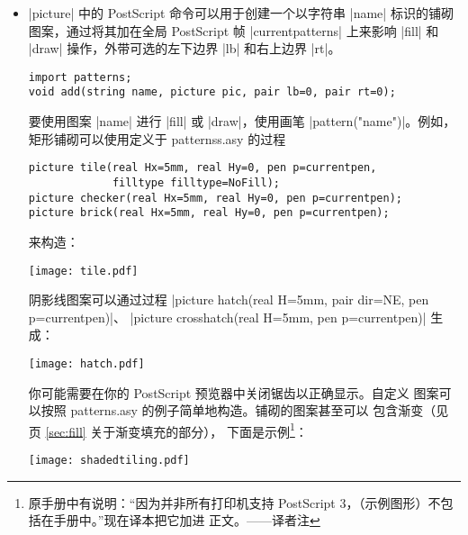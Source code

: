 \documentclass{ctexbook}
\newcommand*\prgname[1]{\textsf{#1}}
\newcommand\transnote[1]{\footnote{#1——译者注}}
\begin{document}
\begin{itemize}
  由于 \prgname{PostScript} 不支持透明，这个特性仅对 \verb=-f pdf= 输出格式
  选项有效。可以从 PDF 结果文件通过 \prgname{ImageMagick convert} 程序生成。
  标签永远以 |opacity| 值 |1| 绘制。透明填充的一个简单例子在示例文件
  \prgname{transparency.asy} 中给出\transnote{效果如下：\\
  \vbox{}%
  \texttt{[image: transparency.pdf]}\box0}。

\item |picture| 中的 \prgname{PostScript} 命令可以用于创建一个以字符串 |name|
  标识的铺砌图案，通过将其加在全局 \prgname{PostScript} 帧 |currentpatterns|
  上来影响 |fill| 和 |draw| 操作，外带可选的左下边界 |lb| 和右上边界 |rt|。
\begin{lstlisting}
import patterns;
void add(string name, picture pic, pair lb=0, pair rt=0);
\end{lstlisting}

  要使用图案 |name| 进行 |fill| 或 |draw|，使用画笔 |pattern("name")|。例如，
  矩形铺砌可以使用定义于 \prgname{patternss.asy} 的过程
\begin{lstlisting}
picture tile(real Hx=5mm, real Hy=0, pen p=currentpen,
             filltype filltype=NoFill);
picture checker(real Hx=5mm, real Hy=0, pen p=currentpen);
picture brick(real Hx=5mm, real Hy=0, pen p=currentpen);
\end{lstlisting}
  来构造：

\begin{center}
  \texttt{[image: tile.pdf]}
\end{center}
  阴影线图案可以通过过程
  |picture hatch(real H=5mm, pair dir=NE, pen p=currentpen)|、
  |picture crosshatch(real H=5mm, pen p=currentpen)| 生成：

\begin{center}
  \texttt{[image: hatch.pdf]}
\end{center}

  你可能需要在你的 \prgname{PostScript} 预览器中关闭锯齿以正确显示。自定义
  图案可以按照 \prgname{patterns.asy} 的例子简单地构造。铺砌的图案甚至可以
  包含渐变（见 \pageref{sec:fill} 页 \ref{sec:fill} 关于渐变填充的部分），
  下面是示例\transnote{原手册中有说明：“因为并非所有打印机支持
  \prgname{PostScript 3}，（示例图形）不包括在手册中。”现在译本把它加进
  正文。}：

\begin{center}
  \texttt{[image: shadedtiling.pdf]}
\end{center}


\end{itemize}
\end{document}
